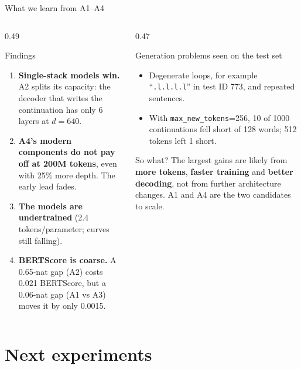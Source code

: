 \documentclass[aspectratio=169,11pt]{beamer}
\newcommand{\code}[1]{\texttt{\small #1}}
\begin{document}
\begin{frame}{What we learn from A1--A4}
  \begin{columns}[T]
    \begin{column}{0.49\textwidth}
      \begin{block}{Findings}
        \small
        \begin{enumerate}
          \item \textbf{Single-stack models win.} A2 splits its capacity: the decoder that writes the continuation has only 6 layers at $d{=}640$.
          \item \textbf{A4's modern components do not pay off at 200M tokens}, even with 25\% more depth. The early lead fades.
          \item \textbf{The models are undertrained} (2.4 tokens/parameter; curves still falling).
          \item \textbf{BERTScore is coarse.} A 0.65-nat gap (A2) costs 0.021 BERTScore, but a 0.06-nat gap (A1 vs A3) moves it by only 0.0015.
        \end{enumerate}
      \end{block}
    \end{column}
    \begin{column}{0.47\textwidth}
      \begin{alertblock}{Generation problems seen on the test set}
        \small
        \begin{itemize}
          \item Degenerate loops, for example ``\code{.l.l.l.l}'' in test ID 773, and repeated sentences.
          \item With \code{max\_new\_tokens}=256, 10 of 1000 continuations fell short of 128 words; 512 tokens left 1 short.
        \end{itemize}
      \end{alertblock}
      \begin{exampleblock}{So what?}
        \small
        The largest gains are likely from \textbf{more tokens}, \textbf{faster training} and \textbf{better decoding}, not from further architecture changes. A1 and A4 are the two candidates to scale.
      \end{exampleblock}
    \end{column}
  \end{columns}
\end{frame}

\section{Next experiments}
\end{document}
